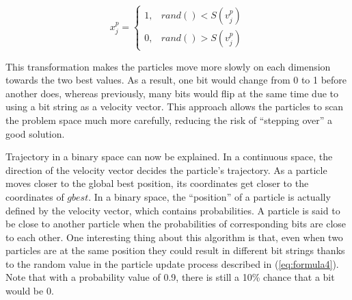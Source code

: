 \begin{equation} \label{eq:formula4}
x_j^p =
\begin{cases}
1, & rand() < S(v_j^p)\\
0, & rand() > S(v_j^p)
\end{cases}
\end{equation}

This transformation makes the particles move more slowly on each dimension towards the two best values. As a result, one bit would change from 0 to 1 before another does, whereas previously, many bits would flip at the same time due to using a bit string as a velocity vector. This approach allows the particles to scan the problem space much more carefully, reducing the risk of ``stepping over'' a good solution.

Trajectory in a binary space can now be explained. In a continuous space, the direction of the velocity vector decides the particle's trajectory. As a particle moves closer to the global best position, its coordinates get closer to the coordinates of $gbest$. In a binary space, the ``position'' of a particle is actually defined by the velocity vector, which contains probabilities. A particle is said to be close to another particle when the probabilities of corresponding bits are close to each other. One interesting thing about this algorithm is that, even when two particles are at the same position they could result in different bit strings thanks to the random value in the particle update process described in (\ref{eq:formula4}). Note that with a probability value of 0.9, there is still a 10\% chance that a bit would be 0.
